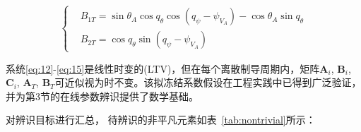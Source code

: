 \begin{equation}
\label{eq:15}
\left\{
\begin{aligned}
& {B_{1T}} = \sin {\theta _A}\cos {q_\theta }\cos \left( {{q_\psi } - {\psi _{{V_A}}}} \right) - \cos {\theta _A}\sin {q_\theta } \\
& {B_{2T}} = \cos {q_\theta }\sin \left( {{q_\psi } - {\psi _{{V_A}}}} \right)
\end{aligned}
\right.
\end{equation}
\begin{remark}
系统\eqref{eq:12}-\eqref{eq:15}是线性时变的(LTV)，但在每个离散制导周期内，矩阵${{\mathbf{A}}_i}$, ${{\mathbf{B}}_i}$, ${{\mathbf{C}}_i}$, ${{\mathbf{A}}_T}$, ${{\mathbf{B}}_T}$可近似视为时不变。该拟冻结系数假设在工程实践中已得到广泛验证，并为第3节的在线参数辨识提供了数学基础。
\end{remark}
对辨识目标进行汇总， 待辨识的非平凡元素如表~\ref{tab:nontrivial}所示：

